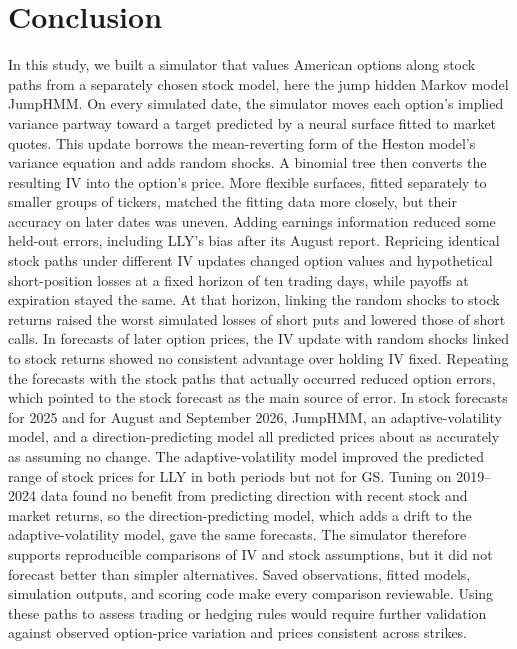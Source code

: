 \section{Conclusion}\label{sec:conclusion}

In this study, we built a simulator that values American options along stock paths from a separately chosen stock model, here the jump hidden Markov model JumpHMM. On every simulated date, the simulator moves each option's implied variance partway toward a target predicted by a neural surface fitted to market quotes. This update borrows the mean-reverting form of the Heston model's variance equation and adds random shocks. A binomial tree then converts the resulting IV into the option's price. More flexible surfaces, fitted separately to smaller groups of tickers, matched the fitting data more closely, but their accuracy on later dates was uneven. Adding earnings information reduced some held-out errors, including LLY's bias after its August report. Repricing identical stock paths under different IV updates changed option values and hypothetical short-position losses at a fixed horizon of ten trading days, while payoffs at expiration stayed the same. At that horizon, linking the random shocks to stock returns raised the worst simulated losses of short puts and lowered those of short calls. In forecasts of later option prices, the IV update with random shocks linked to stock returns showed no consistent advantage over holding IV fixed. Repeating the forecasts with the stock paths that actually occurred reduced option errors, which pointed to the stock forecast as the main source of error. In stock forecasts for 2025 and for August and September 2026, JumpHMM, an adaptive-volatility model, and a direction-predicting model all predicted prices about as accurately as assuming no change. The adaptive-volatility model improved the predicted range of stock prices for LLY in both periods but not for GS. Tuning on 2019--2024 data found no benefit from predicting direction with recent stock and market returns, so the direction-predicting model, which adds a drift to the adaptive-volatility model, gave the same forecasts. The simulator therefore supports reproducible comparisons of IV and stock assumptions, but it did not forecast better than simpler alternatives. Saved observations, fitted models, simulation outputs, and scoring code make every comparison reviewable. Using these paths to assess trading or hedging rules would require further validation against observed option-price variation and prices consistent across strikes.
